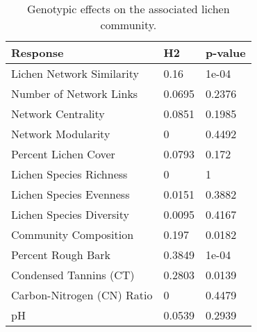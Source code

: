 \begin{table}[ht]
\centering
\begin{tabular}{lll}
  \hline
Response & H2 & p-value \\ 
  \hline
Lichen Network Similarity & 0.16 & 1e-04 \\ 
  Number of Network Links & 0.0695 & 0.2376 \\ 
  Network Centrality & 0.0851 & 0.1985 \\ 
  Network Modularity & 0 & 0.4492 \\ 
  Percent Lichen Cover & 0.0793 & 0.172 \\ 
  Lichen Species Richness & 0 & 1 \\ 
  Lichen Species Evenness & 0.0151 & 0.3882 \\ 
  Lichen Species Diversity & 0.0095 & 0.4167 \\ 
  Community Composition & 0.197 & 0.0182 \\ 
  Percent Rough Bark & 0.3849 & 1e-04 \\ 
  Condensed Tannins (CT) & 0.2803 & 0.0139 \\ 
  Carbon-Nitrogen (CN) Ratio & 0 & 0.4479 \\ 
  pH & 0.0539 & 0.2939 \\ 
   \hline
\end{tabular}
\caption{Genotypic effects on the associated lichen community.} 
\label{tab:h2_table}
\end{table}
